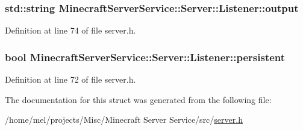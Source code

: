 \subsubsection[{\texorpdfstring{output}{output}}]{\setlength{\rightskip}{0pt plus 5cm}std\+::string Minecraft\+Server\+Service\+::\+Server\+::\+Listener\+::output}\hypertarget{struct_minecraft_server_service_1_1_server_1_1_listener_a556f64e2111a3ba08538fda0ec9e63f9}{}\label{struct_minecraft_server_service_1_1_server_1_1_listener_a556f64e2111a3ba08538fda0ec9e63f9}


Definition at line 74 of file server.\+h.

\subsubsection[{\texorpdfstring{persistent}{persistent}}]{\setlength{\rightskip}{0pt plus 5cm}bool Minecraft\+Server\+Service\+::\+Server\+::\+Listener\+::persistent}\hypertarget{struct_minecraft_server_service_1_1_server_1_1_listener_a5c2d263cbd47b373785c121fa90e8018}{}\label{struct_minecraft_server_service_1_1_server_1_1_listener_a5c2d263cbd47b373785c121fa90e8018}


Definition at line 72 of file server.\+h.



The documentation for this struct was generated from the following file\+:\begin{DoxyCompactItemize}
\item 
/home/mel/projects/\+Misc/\+Minecraft Server Service/src/\hyperlink{server_8h}{server.\+h}\end{DoxyCompactItemize}
